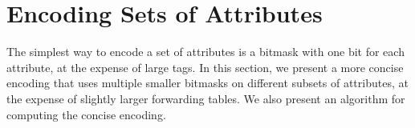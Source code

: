 \section{Encoding Sets of Attributes} 
\label{sec:flextag_encoding} 
The simplest way to encode a set of attributes is a bitmask with one
bit for each attribute, at the expense of large tags.  In this
section, we present a more concise encoding that uses multiple smaller
bitmasks on different subsets of attributes, at the expense of
slightly larger forwarding tables.  We also present an algorithm
for computing the concise encoding.


